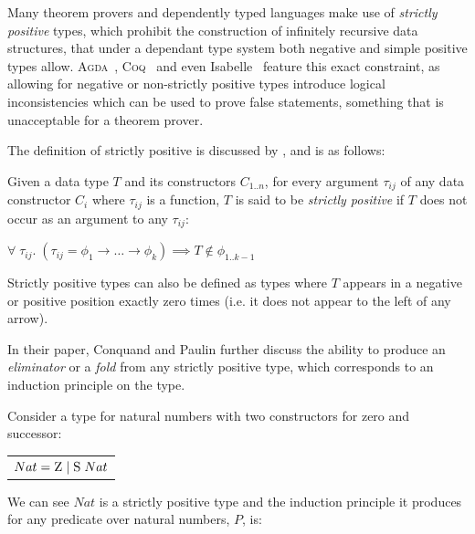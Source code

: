 Many theorem provers and dependently typed languages make use of \textit{strictly positive} types, which
prohibit the construction of infinitely recursive data structures, that under a dependant type system
both negative and simple positive types allow.
\textsc{Agda}~\citep{AgdaStrictlyPositive}, \textsc{Coq}~\citep{CoqStrictlyPositive} and even
Isabelle~\citep{IsabelleStrictlyPositive} feature this exact constraint, as allowing for negative
or non-strictly positive types introduce logical inconsistencies which can be used to prove false statements,
something that is unacceptable for a theorem prover.

The definition of strictly positive is discussed by \citet{CoquandTypes}, and is as follows:

\theoremstyle{definition}
\begin{definition}
    \label{def:sp}
    Given a data type $T$ and its constructors $C_{1..n}$, for every argument $\tau_{ij}$
    of any data constructor $C_i$ where $\tau_{ij}$ is a function, $T$ is said to be \textit{strictly positive} if 
    $T$ does not occur as an argument to any $\tau_{ij}$:

    \begin{center}
        $\forall\; \tau_{ij}.\;
        (\tau_{ij} = \phi_{1} \rightarrow \dots \rightarrow \phi_{k})
        \implies T \notin \phi_{1..k-1}$
    \end{center}
\end{definition}

Strictly positive types can also be defined as types where $T$ appears in a negative or positive 
position exactly zero times (i.e. it does not appear to the left of any arrow).

In their paper, Conquand and Paulin further discuss the ability to produce an \textit{eliminator} or a
\textit{fold} from any strictly positive type, which corresponds to an induction principle on the type.

Consider a type for natural numbers with two constructors for zero and successor:

\begin{center}
    \begin{tabular}{l}
        $Nat = \textsc{Z}\; \vert\; \textsc{S}\; Nat$ \\
    \end{tabular} 
\end{center}

We can see $Nat$ is a strictly positive type and the induction principle it produces
for any predicate over natural numbers, $P$, is:

